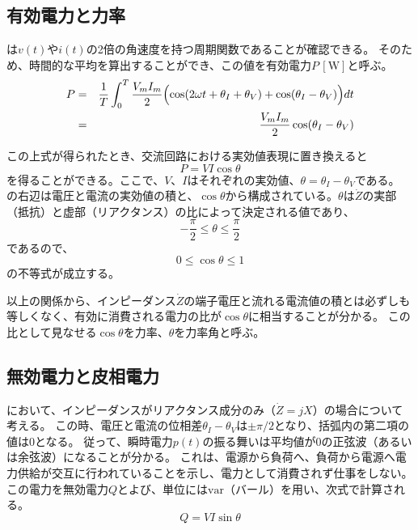 \documentclass[11pt,dvipdfmx]{jarticle}
\begin{document}
\subsection{有効電力と力率}
は$v(t)$や$i(t)$の2倍の角速度を持つ周期関数であることが確認できる。
そのため、時間的な平均を算出することができ、この値を有効電力$P\,[\mathrm{W}]$と呼ぶ。
\begin{eqnarray}
	P &=& \frac{1}{T}\int_0^T \frac{V_mI_m}{2}\Bigl(\cos(2\omega t + \theta_I+\theta_V)+\cos(\theta_I - \theta_V)\Bigr) dt\nonumber\\
	&=&\frac{V_mI_m}{2}\cos(\theta_I - \theta_V)
\end{eqnarray}

この上式が得られたとき、交流回路における実効値表現に置き換えると
\begin{equation}
	P = VI\cos\theta
	\label{eq:power}
\end{equation}
を得ることができる。ここで、$V$、$I$はそれぞれの実効値、$\theta=\theta_I-\theta_V$である。
の右辺は電圧と電流の実効値の積と、$\cos\theta$から構成されている。$\theta$は$\dot{Z}$の実部（抵抗）と虚部（リアクタンス）の比によって決定される値であり、
\begin{equation}
	-\frac{\pi}{2}\leq\theta\leq\frac{\pi}{2}
\end{equation}
であるので、
\begin{equation}
	0\leq\cos\theta\leq 1
\end{equation}
の不等式が成立する。

以上の関係から、インピーダンス$\dot{Z}$の端子電圧と流れる電流値の積とは必ずしも等しくなく、有効に消費される電力の比が$\cos\theta$に相当することが分かる。
この比として見なせる$\cos\theta$を力率、$\theta$を力率角と呼ぶ。

\subsection{無効電力と皮相電力}
において、インピーダンスがリアクタンス成分のみ（$\dot{Z}=jX$）の場合について考える。
この時、電圧と電流の位相差$\theta_I-\theta_V$は$\pm\pi/2$となり、括弧内の第二項の値は0となる。
従って、瞬時電力$p(t)$の振る舞いは平均値が0の正弦波（あるいは余弦波）になることが分かる。
これは、電源から負荷へ、負荷から電源へ電力供給が交互に行われていることを示し、電力として消費されず仕事をしない。
この電力を無効電力$Q$とよび、単位には$\mathrm{var}$（バール）を用い、次式で計算される。
\begin{equation}
	Q = VI \sin \theta
\end{equation}
\end{document}
